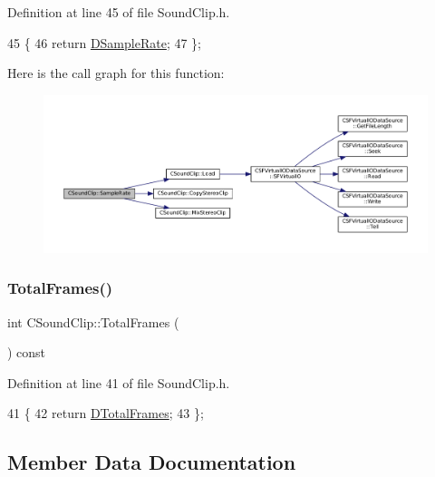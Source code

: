 Definition at line 45 of file Sound\+Clip.\+h.


\begin{DoxyCode}
45                               \{
46             \textcolor{keywordflow}{return} \hyperlink{classCSoundClip_ac1b9306140da2f89f6178833e0a9b887}{DSampleRate};  
47         \};
\end{DoxyCode}
Here is the call graph for this function\+:
\nopagebreak
\begin{figure}[H]
\begin{center}
\leavevmode
\includegraphics[width=350pt]{classCSoundClip_ac89dc3d2f25a43fcd97268ec9828f709_cgraph}
\end{center}
\end{figure}
\hypertarget{classCSoundClip_abcd12e4989ecf6f31011e65c27c994f9}{}\label{classCSoundClip_abcd12e4989ecf6f31011e65c27c994f9} 
\subsubsection{\texorpdfstring{Total\+Frames()}{TotalFrames()}}
{\footnotesize\ttfamily int C\+Sound\+Clip\+::\+Total\+Frames (\begin{DoxyParamCaption}{ }\end{DoxyParamCaption}) const\hspace{0.3cm}{\ttfamily [inline]}}



Definition at line 41 of file Sound\+Clip.\+h.


\begin{DoxyCode}
41                                \{
42             \textcolor{keywordflow}{return} \hyperlink{classCSoundClip_ab0d9eb261d09fa2a106658276f37285b}{DTotalFrames};  
43         \};
\end{DoxyCode}


\subsection{Member Data Documentation}
\hypertarget{classCSoundClip_a01aaf0b87b9b8226c77a6931d03d6a64}{}\label{classCSoundClip_a01aaf0b87b9b8226c77a6931d03d6a64} 
